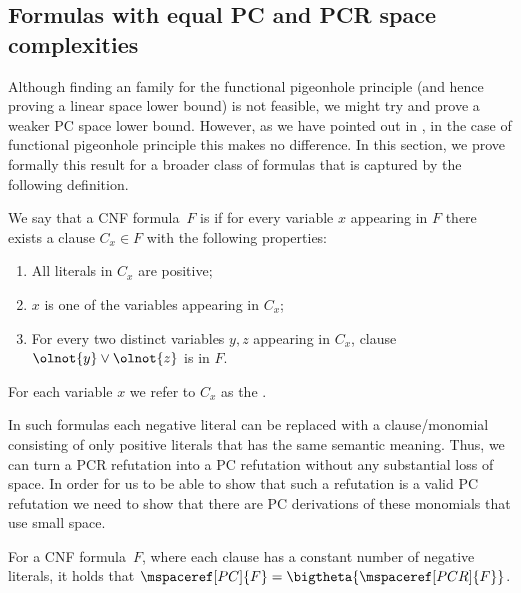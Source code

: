 \subsection{Formulas with equal PC and PCR space complexities}
\label{sec:varweightconstrained}


Although finding an \kextendible{} family for the functional
pigeonhole principle (and hence proving a linear space lower bound) is not
feasible, we might try and prove a weaker PC space lower
bound. However, as we have pointed out in
, in the case of functional pigeonhole
principle this makes no difference. In this section, we prove formally
this result for a broader class of formulas that is captured by the
following definition.

\begin{definition}\label{def:var-weight-constrained}
  We say that a CNF formula~$F$ is
  \introduceterm{\varweightconstrained{}} if for every variable $x$
  appearing in $F$ there exists a clause $C_x \in F$ with the
  following properties:
  \begin{enumerate}
  \item All literals in $C_x$ are positive;
  \item $x$ is one of the variables appearing in $C_x$;
  \item For every two distinct variables $y, z$ appearing in $C_x$,
    clause $\olnot{y} \lor \olnot{z}$ is in $F$.
  \end{enumerate}
  For each variable $x$ we refer to $C_x$ as the
  .
\end{definition}

In such formulas each negative literal can be replaced with a
clause/monomial consisting of only positive literals that has the same
semantic meaning. Thus, we can turn a PCR refutation into a PC
refutation without any substantial loss of space. In order for us to
be able to show that such a refutation is a valid PC refutation we
need to show that there are PC derivations of these monomials that use
small space.

\begin{theorem}\label{th:varweightconstrained}
  For a \varweightconstrained{} CNF formula~$F$, where each clause has
  a constant number of negative literals, it holds that
  $\mspaceref[PC]{F} = \bigtheta{\mspaceref[PCR]{F}}$.
\end{theorem}

%


